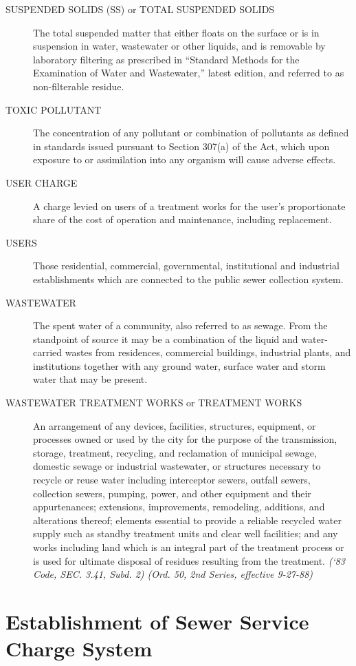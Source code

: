 \documentclass[code.tex]{subfiles}
\begin{document}
\begin{description}
\item[SUSPENDED SOLIDS (SS) or TOTAL SUSPENDED SOLIDS] The total suspended matter that either floats on the surface or is in suspension in water, wastewater or other liquids, and is removable by laboratory filtering as prescribed in “Standard Methods for the Examination of Water and Wastewater,” latest edition, and referred to as non-filterable residue.
\item[TOXIC POLLUTANT] The concentration of any pollutant or combination of pollutants as defined in standards issued pursuant to Section 307(a) of the Act, which upon exposure to or assimilation into any organism will cause adverse effects.
\item[USER CHARGE] A charge levied on users of a treatment works for the user’s proportionate share of the cost of operation and maintenance, including replacement.
\item[USERS] Those residential, commercial, governmental, institutional and industrial establishments which are connected to the public sewer collection system.
\item[WASTEWATER] The spent water of a community, also referred to as sewage.  From the standpoint of source it may be a combination of the liquid and water-carried wastes from residences, commercial buildings, industrial plants, and institutions together with any ground water, surface water and storm water that may be present.
\item[WASTEWATER TREATMENT WORKS or TREATMENT WORKS] An arrangement of any devices, facilities, structures, equipment, or processes owned or used by the city for the purpose of the transmission, storage, treatment, recycling, and reclamation of municipal sewage, domestic sewage or industrial wastewater, or structures necessary to recycle or reuse water including interceptor sewers, outfall sewers, collection sewers, pumping, power, and other equipment and their appurtenances; extensions, improvements, remodeling, additions, and alterations thereof; elements essential to provide a reliable recycled water supply such as standby treatment units and clear well facilities; and any works including land which is an integral part of the treatment process or is used for ultimate disposal of residues resulting from the treatment.\newline
\emph{(‘83 Code, SEC. 3.41, Subd. 2) (Ord. 50, 2nd Series, effective 9-27-88)}
\end{description}
\section{Establishment of Sewer Service Charge System}
\end{document}
